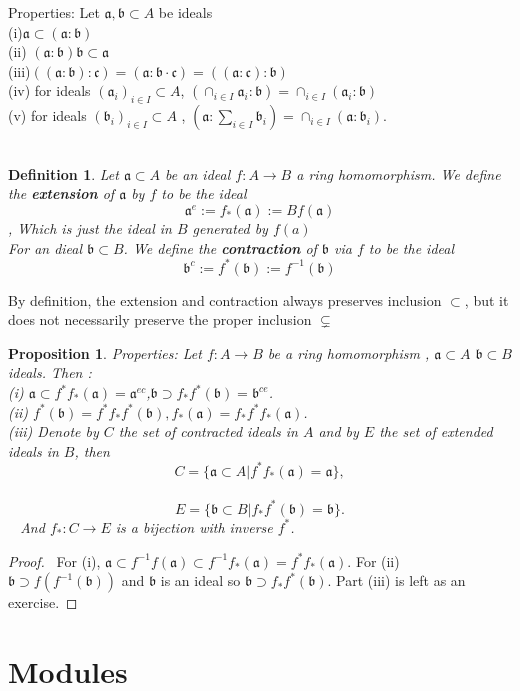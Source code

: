 \documentclass[11pt]{article}
\newtheorem{prop}[thm]{Proposition}
\newtheorem{dfn}[thm]{Definition}
\newcommand{\sca}{{\mathfrak a}}
\newcommand{\scb}{{\mathfrak b}}
\newcommand{\scc}{{\mathfrak c}}
\begin{document}
Properties: Let $\sca, \scb\subset A$ be ideals \\
(i)$\sca\subset (\sca:\scb)$\\
(ii) $(\sca:\scb)\scb\subset \sca$\\
(iii)$((\sca:\scb):\scc)=(\sca:\scb\cdot\scc)=((\sca:\scc):\scb)$\\
(iv) for ideals $(\sca_i)_{i\in I}\subset A$, $(\cap_{i\in I}\sca_i:\scb)=\cap_{i\in I}(\sca_i:\scb)$\\
(v) for ideals $(\scb_i)_{i\in I}\subset A$ , $(\sca:\sum_{i\in I }\scb_i)=\cap_{i\in I} (\sca:\scb_i)$.\\
 
\begin{dfn}\label{def:extention_contraction}
Let $\sca\subset A$ be an ideal $f: A\rightarrow  B$ a ring homomorphism. We define the \textbf{extension} of $\sca$ by $f$ to be the ideal 
$$
\sca^e:=f_{*}(\sca):=B f(\sca)
$$,
Which is just the ideal in $B$ generated by $f(a)$\\
For an dieal $\scb\subset B$. We define the \textbf{contraction} of $\scb$ via $f$ to be the ideal 
$$
\scb^c:=f^*(\scb):=f^{-1}(\scb)
$$
\end{dfn}
{\color{red} By definition, the extension and contraction always preserves inclusion $\subset$, but it does not necessarily preserve the proper inclusion $\subsetneq$}
\begin{prop}\label{prop:properties_extension_contractino}
Properties: Let $f: A\rightarrow B$ be a ring homomorphism , $\sca\subset A$ $\scb\subset B$ ideals. Then :\\
(i) $\sca\subset f^*f_*(\sca)=\sca^{e c}$,$\scb\supset f_{*}f^*(\scb)=\scb^{ce}$.\\
(ii) $f^*(\scb)=f^* f_*f^*(\scb), f_*(\sca)=f_* f^*f_*(\sca)$.\\
(iii) Denote by $C$ the set of contracted ideals in $A$ and by $E$ the set of extended ideals in $B$, then 
$$
C=\{\sca\subset A|f^*f_*(\sca)=\sca\},
$$
 
$$
E=\{\scb\subset B| f_* f^*(\scb)=\scb\}.
$$ 
And $f_*: C\rightarrow E$ is a bijection with inverse $f^*$.
\end{prop}
\begin{proof}
 For (i), $\sca\subset f^{-1}f(\sca)\subset f^{-1}f_{*}(\sca)=f^{*}f_*(\sca)$. For (ii) $\scb \supset f(f^{-1}(\scb))$ and $\scb$ is an ideal so $\scb \supset f_{*}f^*(\scb)$. Part (iii) is left as an exercise.
\end{proof}
\section{Modules}
\end{document}
